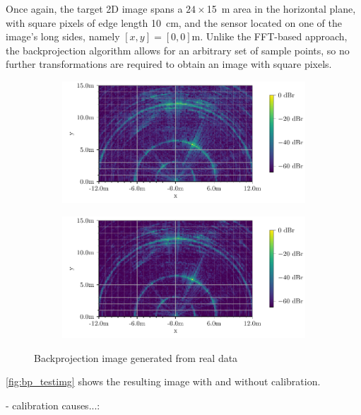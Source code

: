 Once again, the target 2D image spans a $24 \times$\SI{15}{\m} area in the horizontal plane,
with square pixels of edge length \SI{10}{\cm},
and the sensor located on one of the image's long sides, namely $[x,y] = [0,0]$m.
Unlike the FFT-based approach,
the backprojection algorithm allows for an arbitrary set of sample points,
so no further transformations are required to obtain an image with square pixels.\\
\begin{figure}[t]
    \centering
    \begin{subfigure}{0.8\textwidth}
        \includegraphics[width=\textwidth]{../figures/testimg_uncalibrated_bp.pdf}
    \end{subfigure}
    \begin{subfigure}{0.8\textwidth}
        \includegraphics[width=\textwidth]{../figures/testimg_calibrated_bp.pdf}
    \end{subfigure}
    \caption{Backprojection image generated from real data}
    \label{fig:bp_testimg}
\end{figure}
\autoref{fig:bp_testimg} shows the resulting image with and without calibration.

- calibration causes...:

